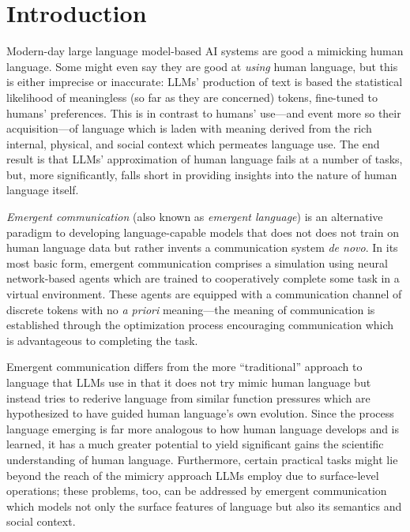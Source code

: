 


\chapter{Introduction}

Modern-day large language model-based AI systems are good a mimicking human language.
Some might even say they are good at \emph{using} human language, but this is either imprecise or inaccurate:
  LLMs' production of text is based the statistical likelihood of meaningless (so far as they are concerned) tokens, fine-tuned to humans' preferences.
This is in contrast to humans' use---and event more so their acquisition---of language which is laden with meaning derived from the rich internal, physical, and social context which permeates language use.
The end result is that LLMs' approximation of human language fails at a number of tasks, but, more significantly, falls short in providing insights into the nature of human language itself.

\emph{Emergent communication} (also known as \emph{emergent language}) is an alternative paradigm to developing language-capable models that does not does not train on human language data but rather invents a communication system \emph{de novo}.
In its most basic form, emergent communication comprises a simulation using neural network-based agents which are trained to cooperatively complete some task in a virtual environment.
These agents are equipped with a communication channel of discrete tokens with no \emph{a priori} meaning---the meaning of communication is established through the optimization process encouraging communication which is advantageous to completing the task.

Emergent communication differs from the more ``traditional'' approach to language that LLMs use in that it does not try mimic human language but instead tries to rederive language from similar function pressures which are hypothesized to have guided human language's own evolution.
Since the process language emerging is far more analogous to how human language develops and is learned, it has a much greater potential to yield significant gains the scientific understanding of human language.
Furthermore, certain practical tasks might lie beyond the reach of the mimicry approach LLMs employ due to surface-level operations; these problems, too, can be addressed by emergent communication which models not only the surface features of language but also its semantics and social context.

